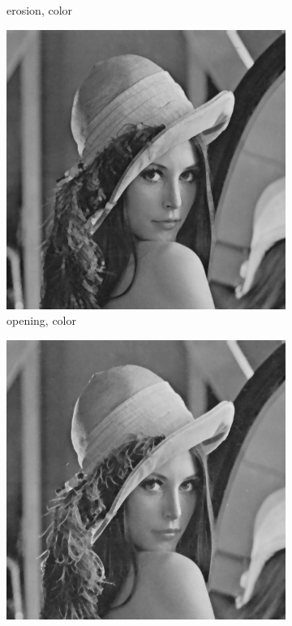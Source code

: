 \begin{figure}[!ht]
\begin{subfigure}[t]{0.22\textwidth}
    \caption{erosion, color}
    \centering
  \end{subfigure}
\begin{subfigure}[t]{0.22\textwidth}
    \includegraphics[width=0.9\linewidth]{../project/images/outputs/compare_gray/opening.png}
    \caption{opening, color}
    \centering
  \end{subfigure}
\begin{subfigure}[t]{0.22\textwidth}
    \includegraphics[width=0.9\linewidth]{../project/images/outputs/compare_gray/closing.png}

\end{subfigure}
\end{figure}
